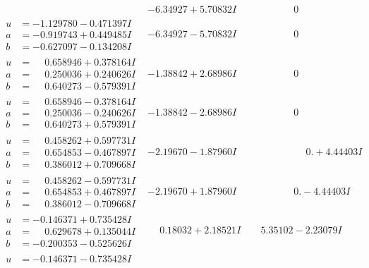 \documentclass[1p]{elsarticle_modified}
\theoremstyle{definition}
\begin{document}
$$\begin{array}{c|c|c}
 & -6.34927 + 5.70832 I & \phantom{-0.000000 } 0 \\ \hline\begin{aligned}
u &= -1.129780 - 0.471397 I \\
a &= -0.919743 + 0.449485 I \\
b &= -0.627097 - 0.134208 I\end{aligned}
 & -6.34927 - 5.70832 I & \phantom{-0.000000 } 0 \\ \hline\begin{aligned}
u &= \phantom{-}0.658946 + 0.378164 I \\
a &= \phantom{-}0.250036 + 0.240626 I \\
b &= \phantom{-}0.640273 - 0.579391 I\end{aligned}
 & -1.38842 + 2.68986 I & \phantom{-0.000000 } 0 \\ \hline\begin{aligned}
u &= \phantom{-}0.658946 - 0.378164 I \\
a &= \phantom{-}0.250036 - 0.240626 I \\
b &= \phantom{-}0.640273 + 0.579391 I\end{aligned}
 & -1.38842 - 2.68986 I & \phantom{-0.000000 } 0 \\ \hline\begin{aligned}
u &= \phantom{-}0.458262 + 0.597731 I \\
a &= \phantom{-}0.654853 - 0.467897 I \\
b &= \phantom{-}0.386012 + 0.709668 I\end{aligned}
 & -2.19670 - 1.87960 I & \phantom{-0.000000 -}0. + 4.44403 I \\ \hline\begin{aligned}
u &= \phantom{-}0.458262 - 0.597731 I \\
a &= \phantom{-}0.654853 + 0.467897 I \\
b &= \phantom{-}0.386012 - 0.709668 I\end{aligned}
 & -2.19670 + 1.87960 I & \phantom{-0.000000 } 0. - 4.44403 I \\ \hline\begin{aligned}
u &= -0.146371 + 0.735428 I \\
a &= \phantom{-}0.629678 + 0.135044 I \\
b &= -0.200353 - 0.525626 I\end{aligned}
 & \phantom{-}0.18032 + 2.18521 I & \phantom{-}5.35102 - 2.23079 I \\ \hline\begin{aligned}
u &= -0.146371 - 0.735428 I \\

\end{aligned}
\end{array}$$
\end{document}
